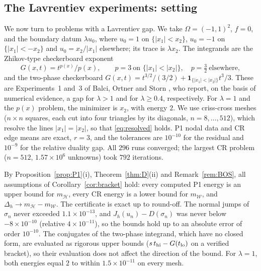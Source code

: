 \documentclass[11pt]{amsart}
\theoremstyle{definition}
\theoremstyle{remark}
\numberwithin{equation}{section}
\newcommand{\abs}[1]{\lvert #1\rvert}
\newcommand{\mW}{m_{\mathcal W}}
\newcommand{\mH}{m_{\mathcal H}}
\begin{document}
\subsection{The Lavrentiev experiments: setting}\label{ssec:lav-setting}
We now turn to problems with a Lavrentiev gap. We take $\Omega=(-1,1)^2$, $f=0$, and the boundary datum $\lambda u_0$, where $u_0=1$ on $\{\abs{x_1}<x_2\}$, $u_0=-1$ on $\{\abs{x_1}<-x_2\}$ and $u_0=x_2/\abs{x_1}$ elsewhere; its trace is $\lambda x_2$. The integrands are the Zhikov-type checkerboard exponent \cite{Zhikov1986}
\[
G(x,t)=t^{p(x)}/p(x),\qquad p=3\ \text{on }\{\abs{x_1}<\abs{x_2}\},\quad p=\tfrac32\ \text{elsewhere},
\]
and the two-phase checkerboard $G(x,t)=t^{3/2}/(3/2)+\mathbf 1_{\{\abs{x_1}<\abs{x_2}\}}t^3/3$. These are Experiments~1 and~3 of Balci, Ortner and Storn \cite{BalciOrtnerStorn2022}, who report, on the basis of numerical evidence, a gap for $\lambda>1$ and for $\lambda\ge0.4$, respectively. For $\lambda=1$ and the $p(x)$ problem, the minimizer is $x_2$, with energy $2$. We use criss-cross meshes ($n\times n$ squares, each cut into four triangles by its diagonals, $n=8,\dots,512$), which resolve the lines $\abs{x_1}=\abs{x_2}$, so that \eqref{eq:resolved} holds. P1 nodal data and CR edge means are exact, $r=3$, and the tolerances are $10^{-10}$ for the residual and $10^{-9}$ for the relative duality gap. All $296$ runs converged; the largest CR problem ($n=512$, $1.57\times10^6$ unknowns) took $792$ iterations.

By Proposition~\ref{prop:P1}(i), Theorem~\ref{thm:D}(ii) and Remark~\ref{rem:BOS}, all assumptions of Corollary~\ref{cor:bracket} hold: every computed P1 energy is an upper bound for $\mH$, every CR energy is a lower bound for $\mW$, and $\Delta_h\to\mH-\mW$. The certificate is exact up to round-off. The normal jumps of $\sigma_n$ never exceeded $1.1\times10^{-13}$, and $J_h(u_n)-D(\sigma_n)$ was never below $-8\times10^{-10}$ (relative $4\times10^{-11}$), so the bounds hold up to an absolute error of order $10^{-10}$. The conjugates of the two-phase integrand, which have no closed form, are evaluated as rigorous upper bounds ($s\,t_{\rm hi}-G(t_{\rm lo})$ on a verified bracket), so their evaluation does not affect the direction of the bound. For $\lambda=1$, both energies equal $2$ to within $1.5\times10^{-11}$ on every mesh.
\end{document}
